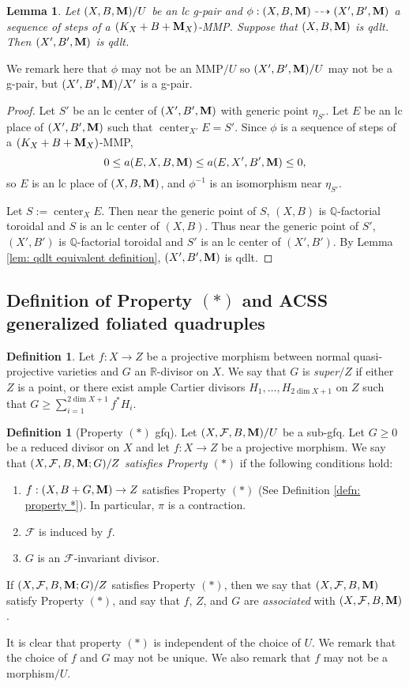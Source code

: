 \documentclass[11pt]{amsart}
\numberwithin{equation}{section}
\newcommand{\Mm}{{\bf{M}}}
\newcommand{\Qq}{\mathbb{Q}}
\newcommand{\Rr}{\mathbb{R}}
\newcommand{\Center}{\operatorname{center}}
\newcommand{\Ff}{\mathcal{F}}
\newtheorem{lem}[thm]{Lemma}
\theoremstyle{definition}
\newtheorem{defn}[thm]{Definition}
\theoremstyle{definition}
\theoremstyle{definition}
\begin{document}
\begin{lem}\label{lem: mmp preserves qdlt}
Let $(X,B,\Mm)/U$ be an lc g-pair and $\phi: (X,B,\Mm)\dashrightarrow (X',B',\Mm)$ a sequence of steps of a $(K_X+B+\Mm_X)$-MMP. Suppose that $(X,B,\Mm)$ is qdlt. Then $(X',B',\Mm)$ is qdlt. 
\end{lem}
We remark here that $\phi$ may not be an MMP$/U$ so $(X',B',\Mm)/U$ may not be a g-pair, but $(X',B',\Mm)/X'$ is a g-pair.
\begin{proof}
Let $S'$ be an lc center of $(X',B',\Mm)$ with generic point $\eta_{S'}$. Let $E$ be an lc place of $(X',B',\Mm)$ such that $\Center_{X'}E=S'$. Since $\phi$ is a sequence of steps of a $(K_X+B+\Mm_X)$-MMP,
$$0\leq a(E,X,B,\Mm)\leq a(E,X',B',\Mm)\leq 0,$$
so $E$ is an lc place of $(X,B,\Mm)$, and $\phi^{-1}$ is an isomorphism near $\eta_{S'}$. 

Let $S:=\Center_XE$. Then near the generic point of $S$, $(X,B)$ is $\Qq$-factorial toroidal and $S$ is an lc center of $(X,B)$. Thus near the generic point of $S'$, $(X',B')$ is $\Qq$-factorial toroidal and $S'$ is an lc center of $(X',B')$. By Lemma \ref{lem: qdlt equivalent definition}, $(X',B',\Mm)$ is qdlt.
\end{proof}

\subsection{Definition of Property \texorpdfstring{$(*)$}{} and ACSS generalized foliated quadruples}

\begin{defn}
Let $f: X\rightarrow Z$ be a projective morphism between normal quasi-projective varieties and $G$ an $\Rr$-divisor on $X$. We say that $G$ is \emph{super$/Z$} if either $Z$ is a point, or there exist ample Cartier divisors $H_1,\dots,H_{2\dim X+1}$ on $Z$ such that $G\geq\sum_{i=1}^{2\dim X+1}f^*H_i.$
\end{defn}

\begin{defn}[Property $(*)$ gfq]\label{defn: foliation property *}
Let $(X,\Ff,B,\Mm)/U$ be a sub-gfq. Let $G\geq 0$ be a reduced divisor on $X$ and let $f: X\rightarrow Z$ be a projective morphism. We say that $(X,\Ff,B,\Mm;G)/Z$ \emph{satisfies Property $(*)$} if the following conditions hold:
\begin{enumerate}
  \item $f: (X,B+G,\Mm)\rightarrow Z$ satisfies Property $(*)$ (See Definition \ref{defn: property *}). In particular, $\pi$ is a contraction.
  \item $\Ff$ is induced by $f$.
  \item $G$ is an $\Ff$-invariant divisor.
\end{enumerate}

If $(X,\Ff,B,\Mm;G)/Z$ satisfies Property $(*)$, then we say that $(X,\Ff,B,\Mm)$ satisfy Property $(*)$, and say that $f$, $Z$, and $G$ are \emph{associated} with $(X,\Ff,B,\Mm)$.

It is clear that property $(*)$ is independent of the choice of $U$. We remark that the choice of $f$ and $G$ may not be unique. We also remark that $f$ may not be a morphism$/U$.
\end{defn}
\end{document}
